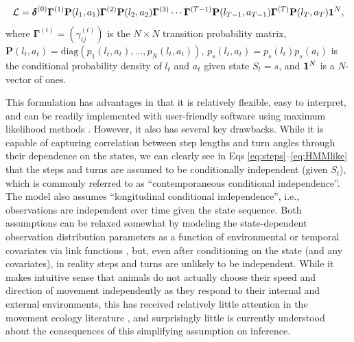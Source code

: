 \documentclass[12pt]{article}\usepackage[]{graphicx}\usepackage[]{xcolor}
\begin{document}
\begin{equation}
  \mathcal{L}={\boldsymbol \delta}^{(0)} {\mathbf \Gamma}^{(1)} {\mathbf P}(l_1,a_1) {\mathbf \Gamma}^{(2)} {\mathbf P}(l_2,a_2) {\mathbf \Gamma}^{(3)} \cdots {\mathbf \Gamma}^{(T-1)} {\mathbf P}(l_{T-1},a_{T-1}) {\mathbf \Gamma}^{(T)} {\mathbf P}(l_T,a_T) {\bf 1}^N,
  \label{eq:HMMlike}
\end{equation}
where ${\mathbf \Gamma}^{(t)}=\left(\gamma_{ij}^{(t)} \right)$ is the $N \times N$ transition probability matrix, ${\mathbf P}(l_t,a_t)=\text{diag}(p_1(l_t,a_t), \ldots, p_N(l_t,a_t))$, $p_s(l_t,a_t)=p_s(l_t) p_s(a_t)$ is the conditional probability density of $l_t$ and $a_t$ given state $S_t=s$, and ${\bf 1}^N$ is a $N$-vector of ones. %

This formulation has advantages in that it is relatively flexible, easy to interpret, and can be readily implemented with user-friendly software using maximum likelihood methods \citep[e.g.,][]{MichelotEtAl2016,McClintockMichelot2018}. However, it also has several key drawbacks. While it is capable of capturing correlation between step lengths and turn angles through their dependence on the states, we can clearly see in Eqs \ref{eq:steps}--\ref{eq:HMMlike} that the steps and turns are assumed to be conditionally independent (given $S_t$), which is commonly referred to as ``contemporaneous conditional independence''. The model also assumes ``longitudinal conditional independence'', i.e., observations are independent over time given the state sequence. Both assumptions can be relaxed somewhat by modeling the state-dependent observation distribution parameters as a function of environmental or temporal covariates via link functions \citep[e.g.,][]{McClintockEtAl2012,rivest2016general}, but, even after conditioning on the state (and any covariates), in reality steps and turns are unlikely to be independent. While it makes intuitive sense that animals do not actually choose their speed and direction of movement independently as they respond to their internal and external environments, this has received relatively little attention in the movement ecology literature \citep[but for an example that does not consider latent behavioral states, see][]{hodel2022circular}, and surprisingly little is currently understood about the consequences of this simplifying assumption on inference. 
\end{document}
